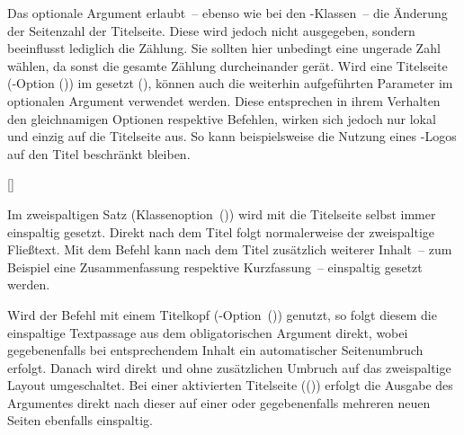 \begin{DeclareEntity*}{}
\begin{DeclareEntity*}{}
\begin{DeclareEntity*}{}
\begin{Declaration}
\begin{Declaration}
\begin{Declaration}
\begin{Declaration}
\begin{Declaration}
\begin{Declaration}
\begin{Declaration}
\begin{Declaration}
\begin{Declaration}
\begin{Declaration}
\begin{Declaration}
Das optionale Argument erlaubt~-- ebenso wie bei den \KOMAScript-Klassen~-- die
Änderung der Seitenzahl der Titelseite. Diese wird jedoch nicht ausgegeben, 
sondern beeinflusst lediglich die Zählung. Sie sollten hier unbedingt eine 
ungerade Zahl wählen, da sonst die gesamte Zählung durcheinander gerät. 
Wird eine Titelseite
(\KOMAScript-Option ()) im \TUDCD 
gesetzt (), können auch die weiterhin aufgeführten 
Parameter im optionalen Argument verwendet werden. Diese entsprechen in ihrem 
Verhalten den gleichnamigen Optionen respektive Befehlen, wirken sich jedoch 
nur lokal und einzig auf die Titelseite aus. So kann beispielsweise die Nutzung 
eines \DDC-Logos auf den Titel beschränkt bleiben.
\end{Declaration}
\end{Declaration}
\end{Declaration}
\end{Declaration}
\end{Declaration}
\end{Declaration}
\end{Declaration}
\end{Declaration}
\end{Declaration}
\end{Declaration}
\end{Declaration}

\begin{Declaration}
  {[]}

Im zweispaltigen Satz (Klassenoption~()) 
wird mit  die Titelseite selbst immer einspaltig gesetzt. 
Direkt nach dem Titel folgt normalerweise der zweispaltige Fließtext. Mit dem 
Befehl  kann nach dem Titel zusätzlich weiterer 
Inhalt~-- zum Beispiel eine Zusammenfassung respektive Kurzfassung~-- 
einspaltig gesetzt werden.

Wird der Befehl mit einem Titelkopf 
(\KOMAScript-Option~()) genutzt, so 
folgt diesem die einspaltige Textpassage aus dem obligatorischen Argument 
direkt, wobei gegebenenfalls bei entsprechendem Inhalt ein automatischer 
Seitenumbruch erfolgt. Danach wird direkt und ohne zusätzlichen Umbruch auf das 
zweispaltige Layout umgeschaltet. Bei einer aktivierten Titelseite 
(()) erfolgt die Ausgabe des 
Argumentes  direkt nach dieser auf einer oder 
gegebenenfalls mehreren neuen Seiten ebenfalls einspaltig. 


\end{Declaration}
\end{DeclareEntity*}
\end{DeclareEntity*}
\end{DeclareEntity*}
